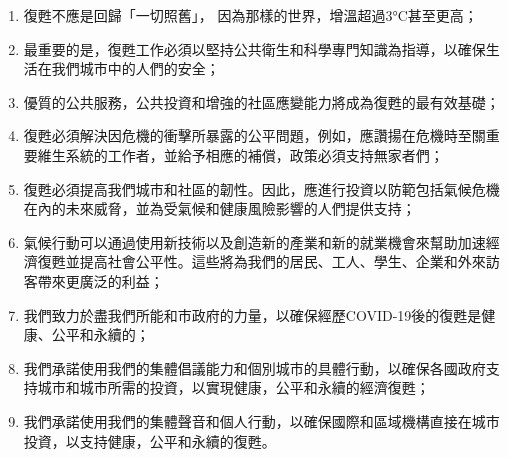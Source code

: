 \documentclass[a4paper,12pt]{article}
\begin{document}
\begin{enumerate}
\item 復甦不應是回歸「一切照舊」， 因為那樣的世界，增溫超過3°C甚至更高；\\
\item 最重要的是，復甦工作必須以堅持公共衛生和科學專門知識為指導，以確保生活在我們城市中的人們的安全；\\
\item 優質的公共服務，公共投資和增強的社區應變能力將成為復甦的最有效基礎；\\
\item 復甦必須解決因危機的衝擊所暴露的公平問題，例如，應讚揚在危機時至關重要維生系統的工作者，並給予相應的補償，政策必須支持無家者們；\\
\item 復甦必須提高我們城市和社區的韌性。因此，應進行投資以防範包括氣候危機在內的未來威脅，並為受氣候和健康風險影響的人們提供支持；\\
\item 氣候行動可以通過使用新技術以及創造新的產業和新的就業機會來幫助加速經濟復甦並提高社會公平性。這些將為我們的居民、工人、學生、企業和外來訪客帶來更廣泛的利益；\\
\item 我們致力於盡我們所能和市政府的力量，以確保經歷COVID-19後的復甦是健康、公平和永續的；\\
\item 我們承諾使用我們的集體倡議能力和個別城市的具體行動，以確保各國政府支持城市和城市所需的投資，以實現健康，公平和永續的經濟復甦；\\
\item 我們承諾使用我們的集體聲音和個人行動，以確保國際和區域機構直接在城市投資，以支持健康，公平和永續的復甦。\\
\end{enumerate}
\end{document}
